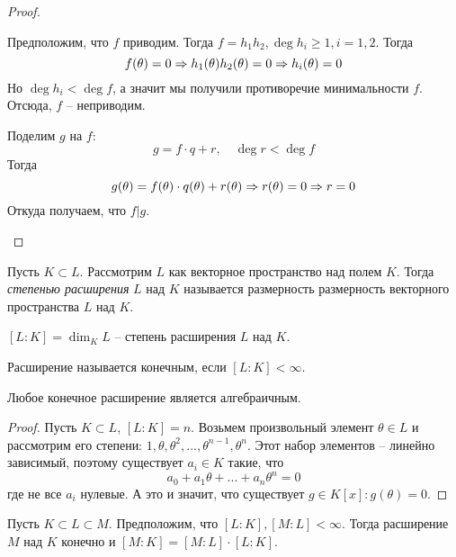 \begin{proof}
	\begin{MyList}
		\item Предположим, что $f$ приводим. Тогда $f = h_1 h_2, \deg h_i \geqslant 1, i = 1, 2$. Тогда
		\[f(\theta) = 0 \Rightarrow h_1 (\theta) h_2 (\theta) = 0 \Rightarrow h_i(\theta) = 0\]
		Но $\deg h_i < \deg f$, а значит мы получили противоречие минимальности $f$. Отсюда, $f$ -- неприводим.

		\item Поделим $g$ на $f$:
		\[g = f \cdot q + r, \quad \deg r < \deg f\]
		Тогда
		\[g(\theta) = f(\theta) \cdot q(\theta) + r(\theta) \Rightarrow r(\theta) = 0 \Rightarrow r = 0\]
		Откуда получаем, что $f | g$.
	\end{MyList}
\end{proof}

\begin{Def}
	Пусть $K \subset L$. Рассмотрим $L$ как векторное пространство над полем $K$.
	Тогда \textit{степенью расширения} $L$ над $K$ называется размерность размерность векторного пространства $L$ над $K$.   
\end{Def}

\begin{notation}
	$[L : K] = \dim_K L$ -- степень расширения $L$ над $K$. 
\end{notation}

\begin{Rem}
	Расширение называется конечным, если $[L : K] < \infty$. 
\end{Rem}

\begin{Thm}
	Любое конечное расширение является алгебраичным.
\end{Thm}

\begin{proof}
	Пусть $K \subset L$, $[L : K] = n$. Возьмем произвольный элемент $\theta \in L$ и рассмотрим его степени: $1, \theta, \theta^2, ..., \theta^{n - 1}, \theta^n$. 
	Этот набор элементов -- линейно зависимый, поэтому существует $a_i \in K$ такие, что 
	\[a_0 + a_1 \theta + ... + a_n \theta^n = 0\]
	где не все $a_i$ нулевые. А это и значит, что существует $g \in K[x] : g(\theta) = 0$.  
\end{proof}

\begin{Thm}
	Пусть $K \subset L \subset M$. Предположим, что $[L : K], [M : L] < \infty$.
	Тогда расширение $M$ над $K$ конечно и $[M : K] = [M : L] \cdot [L : K]$.   
\end{Thm}

